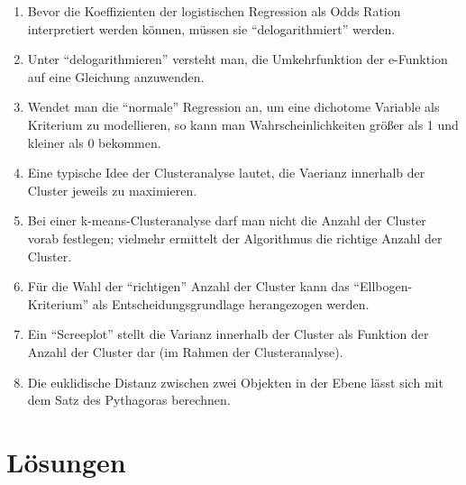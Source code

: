 \documentclass[12pt,ngerman,]{book}
\begin{document}
\begin{enumerate}
\def\labelenumi{\arabic{enumi}.}
\setcounter{enumi}{32}
\item
  Bevor die Koeffizienten der logistischen Regression als Odds Ration
  interpretiert werden können, müssen sie ``delogarithmiert'' werden.
\item
  Unter ``delogarithmieren'' versteht man, die Umkehrfunktion der
  e-Funktion auf eine Gleichung anzuwenden.
\item
  Wendet man die ``normale'' Regression an, um eine dichotome Variable
  als Kriterium zu modellieren, so kann man Wahrscheinlichkeiten größer
  als 1 und kleiner als 0 bekommen.
\item
  Eine typische Idee der Clusteranalyse lautet, die Vaerianz innerhalb
  der Cluster jeweils zu maximieren.
\item
  Bei einer k-means-Clusteranalyse darf man nicht die Anzahl der Cluster
  vorab festlegen; vielmehr ermittelt der Algorithmus die richtige
  Anzahl der Cluster.
\item
  Für die Wahl der ``richtigen'' Anzahl der Cluster kann das
  ``Ellbogen-Kriterium'' als Entscheidungsgrundlage herangezogen werden.
\item
  Ein ``Screeplot'' stellt die Varianz innerhalb der Cluster als
  Funktion der Anzahl der Cluster dar (im Rahmen der Clusteranalyse).
\item
  Die euklidische Distanz zwischen zwei Objekten in der Ebene lässt sich
  mit dem Satz des Pythagoras berechnen.
\end{enumerate}

\section{Lösungen}\label{losungen-1}
\end{document}
